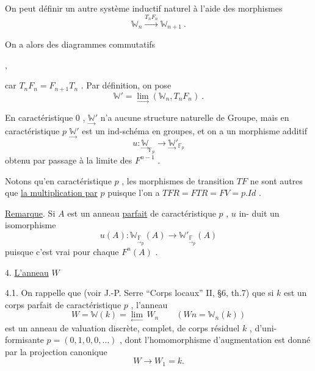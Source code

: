 \documentclass[11pt]{article}
\newcommand{\scanpage}[1]{\par\bigskip\noindent{\small\sffamily[scan #1]}\par}
\newcommand{\mspage}[1]{{\small\sffamily[p.\,#1]}}
\newcommand{\hand}[1]{\textcolor{blue}{#1}}
\newcommand{\uline}[1]{\underline{#1}}
\newenvironment{diagramblock}{\par\begin{center}}{\end{center}\par}
\begin{document}
On peut définir un autre système inductif naturel à l'aide
des morphismes
\[
\mathbb{W}_n \xrightarrow{T_n F_n} \mathbb{W}_{n+1} \ .
\]

On a alors des diagrammes commutatifs
\begin{diagramblock}
\end{diagramblock} ,

car $T_n F_n = F_{n+1} T_n$ . Par définition, on pose
\[
\mathbb{W}' = \underset{\to}{\lim}(\mathbb{W}_n, T_n F_n) \ .
\]

En caractéristique $0$ , $\underset{\to}{\mathbb{W}}'$ n'a aucune structure naturelle de Groupe,
mais en caractéristique $p$ $\underset{\to}{\mathbb{W}}'$ est un ind-schéma en groupes, et on a un
morphisme additif
\[
u : \underset{\to}{\mathbb{W}}_{\mathbb{F}_p} \to \underset{\to}{\mathbb{W}}'_{\mathbb{F}_p}
\]
obtenu par passage à la limite des $F^{n-1}$ .

\mspage{\hand{20}}

\clearpage
\scanpage{129/21}
Notons qu'en caractéristique $p$ , les morphismes de transition $TF$ ne
sont autres que \uline{la multiplication par} $p$ puisque l'on a $TFR = FTR = FV = p.Id$ .

\uline{Remarque}. Si $A$ est un anneau \uline{parfait} de caractéristique $p$ , $u$ in-%
duit un isomorphisme
\[ u(A) : \mathbb{W}_{\underset{\to}{\mathbb{F}}_{p}}(A) \to \mathbb{W}'_{\underset{\to}{\mathbb{F}}_{p}}(A) \]
puisque c'est vrai pour chaque $F^{n}(A)$ .

4. \uline{L'anneau} $W$

4.1. On rappelle que (voir J.-P. Serre ``Corps locaux'' II, §6, th.7)
que si $k$ est un corps parfait de caractéristique $p$ , l'anneau
\[ W = \mathbb{W}(k) = \underset{\leftarrow}{\lim}\, W_{n} \qquad (Wn = \mathbb{W}_{n}(k)) \]
est un anneau de valuation discrète, complet, de corps résiduel $k$ , d'uni-%
formisante $p = (0,1,0,0,\ldots)$ , dont l'homomorphisme d'augmentation est
donné par la projection canonique
\[ W \to W_{1} = k . \]
\end{document}
